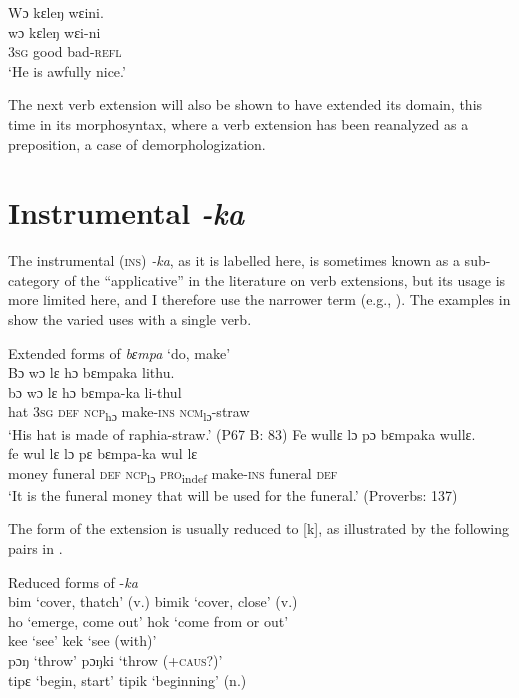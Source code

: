 \ea%
    \label{ex:164}
    Wɔ kɛleŋ wɛini.\\
    \gll wɔ   kɛleŋ wɛi-ni\\
    3\textsc{sg}  good  bad-\textsc{refl}\\
    \glt ‘He is awfully nice.'
\z

The next verb extension will also be shown to have extended its domain, this time in its morphosyntax, where a verb extension has been reanalyzed as a preposition, a case of demorphologization.

\section{Instrumental \textit{-ka}}
\label{sec:6.3}\label{bkm:Ref48814327}\hypertarget{Toc115517802}{}
The instrumental (\textsc{ins}) \textit{{}-ka}, as it is labelled here, is sometimes known as a sub-category of the “applicative” in the literature on verb extensions, but its usage is more limited here, and I therefore use the narrower term (e.g., \citealt{Hyman2014}). The examples in  show the varied uses with a single verb.

\newpage
\ea%
    \label{ex:165}
    Extended forms of \textit{bɛmpa} ‘do, make'\\
  \ea Bɔ wɔ lɛ hɔ bɛmpaka lithu.\\
  \gll bɔ    wɔ    lɛ    hɔ      bɛmpa-ka    li-thul\\
  hat    \textsc{3sg}  \textsc{def}  \textsc{ncp}\textsubscript{hɔ}    make-\textsc{ins}    \textsc{ncm}\textsubscript{lɔ}{}-straw\\
  \glt ‘His hat is made of raphia-straw.' (P67 B: 83)
\vspace{6pt}
  \ex Fe wullɛ lɔ pɔ bɛmpaka wullɛ.\\
  \gll fe      wul    lɛ    lɔ    pɛ      bɛmpa-ka    wul    lɛ\\
  money  funeral  \textsc{def}  \textsc{ncp}\textsubscript{lɔ}  \textsc{pro}\textsubscript{indef}  make-\textsc{ins}    funeral  \textsc{def}\\
  \glt ‘It is the funeral money that will be used for the funeral.' (Proverbs: 137)
\z
\z

The form of the extension is usually reduced to [k], as illustrated by the following pairs in .

\ea%
  \label{ex:166}
  Reduced forms of -\textit{ka}\\

  \ea bim \tab ‘cover, thatch' (v.) \tab bimik \tab ‘cover, close' (v.)\\
  ho \tab ‘emerge, come out' \tab hok \tab ‘come from or out'\\
  kee \tab ‘see' \tab kek \tab ‘see (with)'\\
  pɔŋ \tab ‘throw' \tab pɔŋki \tab ‘throw (+\textsc{caus}?)'\\
  tipɛ \tab ‘begin, start' \tab tipik \tab ‘beginning' (n.)\\
  
